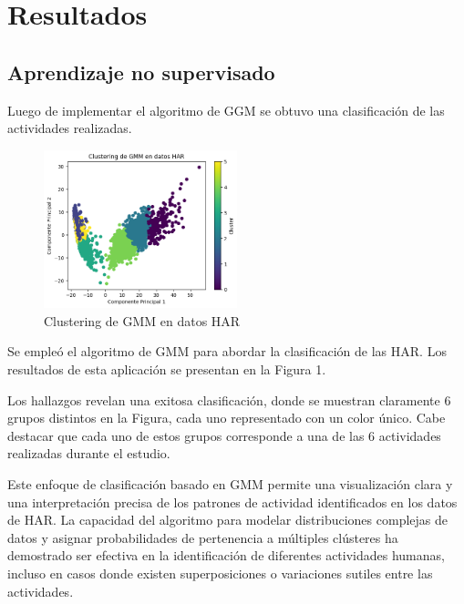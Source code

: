 \documentclass{esannV2}
\begin{document}
\section{Resultados}
\subsection{Aprendizaje no supervisado}
Luego de implementar el algoritmo de GGM se obtuvo una clasificación de las actividades realizadas.
\begin{figure}[ht!]
\centering
\includegraphics[width=0.5\textwidth]{figs/Resultados.png}
\caption{Clustering de GMM en datos HAR}\label{Fig:resultados}
\end{figure}
Se empleó el algoritmo de GMM para abordar la clasificación de las HAR. Los resultados de esta aplicación se presentan en la Figura 1.

Los hallazgos revelan una exitosa clasificación, donde se muestran claramente 6 grupos distintos en la Figura, cada uno representado con un color único. Cabe destacar que cada uno de estos grupos corresponde a una de las 6 actividades realizadas durante el estudio.

Este enfoque de clasificación basado en GMM permite una visualización clara y una interpretación precisa de los patrones de actividad identificados en los datos de HAR. La capacidad del algoritmo para modelar distribuciones complejas de datos y asignar probabilidades de pertenencia a múltiples clústeres ha demostrado ser efectiva en la identificación de diferentes actividades humanas, incluso en casos donde existen superposiciones o variaciones sutiles entre las actividades.
\end{document}

